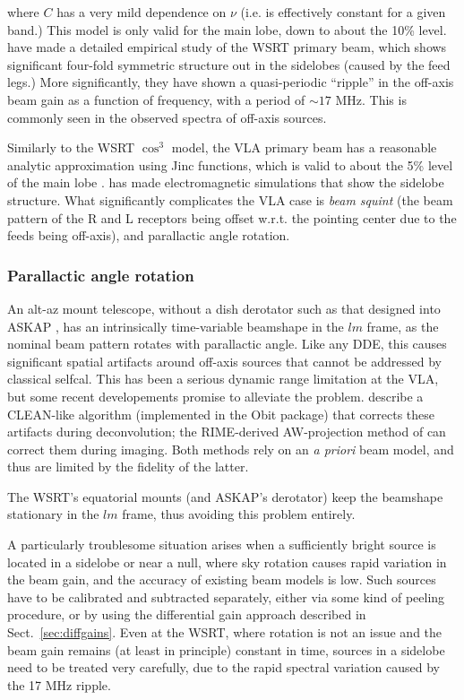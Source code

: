 \documentclass[]{aa}
\begin{document}
where $C$ has a very mild dependence on $\nu$ (i.e. is effectively constant for a given band.) This model is only valid for the main lobe, down to about the 10\% level. \citet{Popping-Braun:WSRT-beam} have made a detailed empirical study of the WSRT primary beam, which shows significant four-fold symmetric structure out in the sidelobes (caused by the feed legs.) More significantly, they have shown a quasi-periodic ``ripple'' in the off-axis beam gain as a function of frequency, with a period of $\sim17$ MHz. This is commonly seen in the observed spectra of off-axis sources.

Similarly to the WSRT $\cos^3$ model, the VLA primary beam has a reasonable analytic approximation using Jinc functions, which is valid to about the 5\% level of the main lobe \citep{Uson-Cotton:VLA-beam}. \citet{Brisken:VLA-beam} has made electromagnetic simulations that show the sidelobe structure. What significantly complicates the VLA case is {\em beam squint} (the beam pattern of the R and L receptors being offset w.r.t. the pointing center due to the feeds being off-axis), and parallactic angle rotation.

\subsubsection{Parallactic angle rotation}

An alt-az mount telescope, without a dish derotator such as that designed into ASKAP \citep{ASKAP}, has an intrinsically time-variable beamshape in the $lm$ frame, as the nominal beam pattern rotates with parallactic angle. Like any DDE, this causes significant spatial artifacts around off-axis sources that cannot be addressed by classical selfcal. This has been a serious dynamic range limitation at the VLA, but some recent developements promise to alleviate the problem. \citet{Uson-Cotton:VLA-beam} describe a CLEAN-like algorithm (implemented in the Obit package) that corrects these artifacts during deconvolution; the RIME-derived AW-projection method of \citet{SB:imageplane} can correct them during imaging. Both methods rely on an \emph{a priori} beam model, and thus are limited by the fidelity of the latter.

The WSRT's equatorial mounts (and ASKAP's derotator) keep the beamshape stationary in the $lm$ frame, thus avoiding this problem entirely.

A particularly troublesome situation arises when a sufficiently bright source is located in a sidelobe or near a null, where sky rotation causes rapid variation in the beam gain, and the accuracy of existing beam models is low. Such sources have to be calibrated and subtracted separately, either via some kind of peeling procedure, or by using the differential gain approach described in Sect.~\ref{sec:diffgains}. Even at the WSRT, where rotation is not an issue and the beam gain remains (at least in principle) constant in time, sources in a sidelobe need to be treated very carefully, due to the rapid spectral variation caused by the 17 MHz ripple.
\end{document}

